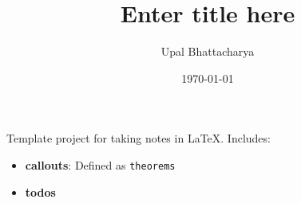 \documentclass[a4paper,colorinlistoftodos]{article}
\author{Upal Bhattacharya}
\date{\today}
\title{Enter title here}
\begin{document}
\maketitle

\listoftodos

\linenumbers

Template project for taking notes in \LaTeX.
Includes:
\begin{itemize}
\item \textbf{callouts}: Defined as \verb|theorems|
\item \textbf{todos} 
\end{itemize}
\end{document}
